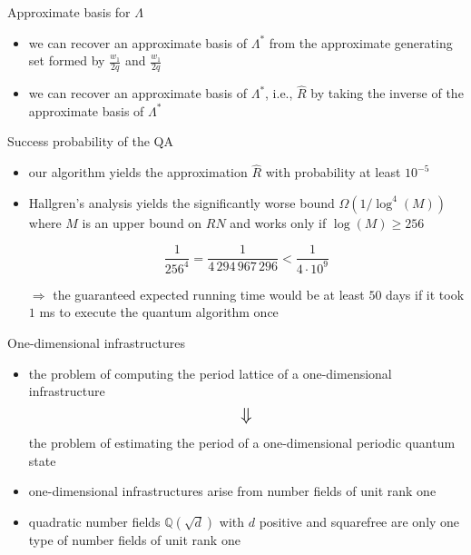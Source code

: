 \documentclass[slideColor]{prosper}
\renewcommand{\>}{\rangle}
\newcommand{\<}{\langle}
\begin{document}

\begin{slide}{Approximate basis for $\Lambda$}

\begin{itemize}

\item we can recover an approximate basis of $\Lambda^*$ from the approximate generating set formed by $\tfrac{w_1}{2q}$ and $\tfrac{w_1}{2q}$  

\medskip
\item we can recover an approximate basis of $\Lambda^*$, i.e., $\hat{R}$ by taking the inverse of the approximate basis of $\Lambda^*$

\end{itemize}

\end{slide}


\begin{slide}{Success probability of the QA}

\begin{itemize}
\item our algorithm yields the approximation $\hat{R}$ with probability at least $10^{-5}$ 

\medskip
\item Hallgren's analysis yields the significantly worse bound $\Omega(1/\log^4(M))$ where $M$ is an upper bound on $RN$ and 
works only if $\log(M) \ge 256$

\medskip
\[
\frac{1}{256^4} = \frac{1}{4\,294\,967\,296} < \frac{1}{4 \cdot 10^9}
\]

\bigskip
$\Rightarrow$ the guaranteed expected running time would be at least $50$ days if it took $1$ ms to execute the quantum algorithm once

\end{itemize}
\end{slide}


\begin{slide}{One-dimensional infrastructures}
\begin{itemize}

\medskip
\item the problem of computing the period lattice of a one-dimensional infrastructure
\[ 
\mbox{{\Large $\Downarrow$}}
\]
the problem of estimating the period of a one-dimensional periodic quantum state

\medskip
\item one-dimensional infrastructures arise from number fields of unit rank one

\medskip
\item 
quadratic number fields $\mathbb{Q}(\sqrt{d})$ with $d$ positive and squarefree are only one type of number fields of unit rank one
\end{itemize}

\end{slide}
\end{document}
